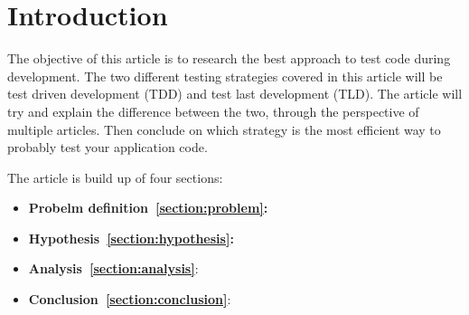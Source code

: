 \section{Introduction}
\label{section:intro}



The objective of this article is to research the best approach to test code during development. 
The two different testing strategies covered in this article will be test driven development (TDD) and test last development (TLD). 
The article will try and explain the difference between the two, through the perspective of multiple articles. 
Then conclude on which strategy is the most efficient way to probably test your application code.  

The article is build up of four sections:
\begin{itemize}
\item \textbf{Probelm definition~\ref{section:problem}:} 
\item \textbf{Hypothesis~\ref{section:hypothesis}:}
\item \textbf{Analysis~\ref{section:analysis}}:
\item \textbf{Conclusion~\ref{section:conclusion}}:
\end{itemize}
